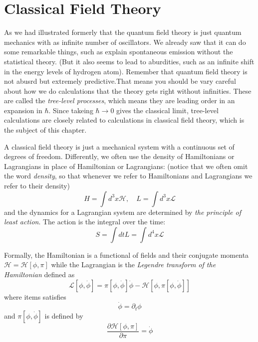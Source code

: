 \documentclass[12pt,openany]{book}
\begin{document}
	\chapter{Classical Field Theory}
	As we had illustrated formerly that the quantum field theory is just quantum mechanics with as infinite number of oscillators.
	We already saw that it can do some remarkable things, such as explain spontaneous emission without the statistical theory.
	(But it also seems to lead to aburdities, such as an infinite shift in the energy levels of hydrogen atom). Remember that 
	quantum field theory is not abusrd but extremely predictive.That means you should be vary careful about how we do calculations 
	that the theory gets right without infinities. These are called the \textit{tree-level processes}, which means
	they are leading order in an expansion in $\hbar$. Since takeing $\hbar\rightarrow0$ gives the classical limit, tree-level calculations
	are closely related to calculations in classical field theory, which is the subject of this chapter.\par 
	A classical field theory is just a mechanical system with a continuous set of degrees of freedom. Differently, we often use the density of Hamiltonians or Lagrangians in place of Hamiltonian or Lagrangians:
	(notice that we often omit the word \textit{density}, so that whenever we refer to Hamiltonians and Lagrangians we refer to their density)
	\begin{equation}
		H=\int d^3x \mathcal{H},\quad L=\int d^3x \mathcal{L}
	\end{equation}
	and the dynamics for a Lagrangian system are determined by \textit{the principle of least action}. The action is the 
	integral over the time:
	\begin{equation}
		S=\int dt L=\int d^4x\mathcal{L}
	\end{equation}\par 
	Formally, the Hamiltonian is a functional of fields and their conjugate momenta $\mathcal{H}=\mathcal{H}[\phi,\pi]$ while the Lagrangian
	is the \textit{Legendre transform of the Hamiltonian} defined as
	\begin{equation}
		\mathcal{L}[\phi,\dot{\phi}]=\pi[\phi,\dot{\phi}]\dot{\phi}-\mathcal{H}[\phi,\pi[\phi,\dot{\phi}]]
	\end{equation}
	where items satisfies 
	\begin{equation*}
		\dot{\phi}=\partial_t\phi
	\end{equation*}
	and $\pi[\phi,\dot{\phi}]$ is defined by 
	\begin{equation*}
		\frac{\partial \mathcal{H}[\phi,\pi]}{\partial \pi}=\dot{\phi}
	\end{equation*}\par 
\end{document}
